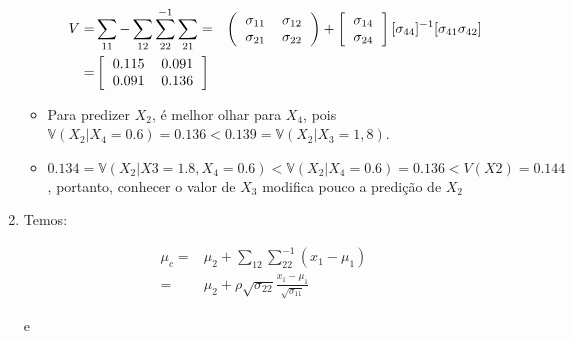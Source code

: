 \documentclass[11pt,a4paper]{book}
\begin{document}
\begin{enumerate}
\begin{itemize}
		\begin{eqnarray*}
			V =& \sum_{11}-\sum_{12}\sum_{22}^{-1}\sum_{21}
			=&\left(
			\begin{tabular}{c c}
			$\sigma_{11}$ & $\sigma_{12}$\\
			$\sigma_{21}$ & $\sigma_{22}$\\
			\end{tabular}
			\right)+
			\left[
			\begin{tabular}{c}
			$\sigma_{14}$\\
			$\sigma_{24}$\\
			\end{tabular}
			\right][\sigma_{44}]^{-1}[\sigma_{41} \sigma_{42}]\\
			=&\left[
			\begin{tabular}{c c}
				0.115 & 0.091\\
				0.091 & 0.136\\
			\end{tabular}
			\right]
		\end{eqnarray*}
		\item
		
		Para predizer $X_2$, é melhor olhar para $X_4$, pois $\mathbb{V}(X_2|X_4=0.6)=0.136 < 0.139=\mathbb{V}(X_2|X_3=1,8)$.
		\item
		$0.134 = \mathbb{V}(X_2|X3 = 1.8,X_4 = 0.6) < \mathbb{V}(X_2|X_4 = 0.6) = 0.136 < V(X2) = 0.144$, portanto, conhecer o valor de $X_3$ modifica pouco a predição de $X_2$
		\end{itemize}
		\item
		Temos:
		
		\begin{eqnarray*}
			\mu_c =&\mu_2+\sum_{12}\sum_{22}^{-1}(x_1-\mu_1)\\
			=&\mu_2+\rho\sqrt{\sigma_{22}}\frac{x_1-\mu_1}{\sqrt{\sigma_{11}}}
		\end{eqnarray*}
		
		e
		

\end{enumerate}
\end{document}
